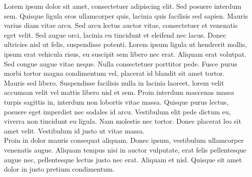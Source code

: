 \documentclass[12pt, a4paper, oneside]{article}
\begin{document}
\begin{small}
    \begin{minipage}[ht]{\textwidth}
        \vspace{-3mm}
        Lorem ipsum dolor sit amet, consectetuer adipiscing elit.
        Sed posuere interdum sem. Quisque ligula eros ullamcorper quis, lacinia quis facilisis sed sapien.
        Mauris varius diam vitae arcu. Sed arcu lectus auctor vitae, consectetuer et venenatis eget velit.
        Sed augue orci, lacinia eu tincidunt et eleifend nec lacus. Donec ultricies nisl ut felis, suspendisse potenti.
        Lorem ipsum ligula ut hendrerit mollis, ipsum erat vehicula risus, eu suscipit sem libero nec erat.
        Aliquam erat volutpat. Sed congue augue vitae neque. Nulla consectetuer porttitor pede.
        Fusce purus morbi tortor magna condimentum vel, placerat id blandit sit amet tortor. \\

        Mauris sed libero. Suspendisse facilisis nulla in lacinia laoreet,
        lorem velit accumsan velit vel mattis libero nisl et sem. Proin interdum maecenas massa turpis sagittis in,
        interdum non lobortis vitae massa. Quisque purus lectus, posuere eget imperdiet nec sodales id arcu.
        Vestibulum elit pede dictum eu, viverra non tincidunt eu ligula. Nam molestie nec tortor.
        Donec placerat leo sit amet velit. Vestibulum id justo ut vitae massa. \\

        Proin in dolor mauris consequat aliquam. Donec ipsum, vestibulum ullamcorper venenatis augue.
        Aliquam tempus nisi in auctor vulputate, erat felis pellentesque augue nec,
        pellentesque lectus justo nec erat. Aliquam et nisl. Quisque sit amet dolor in justo pretium condimentum.
    \end{minipage}
\end{small}

\clearpage


{}
\end{document}
